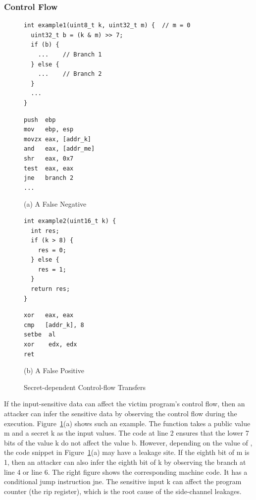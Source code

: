\subsubsection{Control Flow}
\begin{figure}[h]
\begin{minipage}{0.45\linewidth}
\begin{lstlisting}[xleftmargin=.0\textwidth, xrightmargin=.0\textwidth, frame=none]
int example1(uint8_t k, uint32_t m) {  // m = 0
  uint32_t b = (k & m) >> 7;
  if (b) {
    ...    // Branch 1
  } else {
    ...    // Branch 2
  }
  ...
}
\end{lstlisting}
\end{minipage}
\hfill
\begin{minipage}{0.45\linewidth}
\begin{lstlisting}[xleftmargin=.0\textwidth, xrightmargin=.00\textwidth, frame=none, numbers=none, mathescape=true]
push  ebp
mov   ebp, esp
movzx eax, [addr_k]    
and   eax, [addr_me] 
shr   eax, 0x7           
test  eax, eax
jne   branch 2
...
\end{lstlisting}
\end{minipage}\caption*{(a) A False Negative}

\begin{minipage}{0.45\linewidth}
\begin{lstlisting}[xleftmargin=.0\textwidth, xrightmargin=.0\textwidth, frame=none]
int example2(uint16_t k) {
  int res;
  if (k > 8) {
    res = 0;
  } else {
    res = 1;
  }
  return res;
}
\end{lstlisting}
\end{minipage}
\hfill
\begin{minipage}{0.45\linewidth}
\begin{lstlisting}[xleftmargin=.0\textwidth, xrightmargin=.00\textwidth, frame=none, numbers=none, mathescape=true]
xor   eax, eax
cmp   [addr_k], 8
setbe  al
xor    edx, edx
ret
\end{lstlisting}
\end{minipage}\caption*{(b) A False Positive}
\caption{Secret-dependent Control-flow Transfers}\label{fig:chapter3:cf}
\end{figure}

If the input-sensitive data can affect the victim program's control flow, then an attacker can infer the sensitive data by observing the control flow during the execution. Figure~\ref{fig:chapter3:cf}(a) shows such an example. The function takes a public value \textsf{m} and a secret \textsf{k} as the input values. The code at line 2 ensures that the lower 7 bits of the value \textsf{k} do not affect the value \textsf{b}. However, depending on the value of , the code snippet in Figure~\ref{fig:chapter3:cf}(a) may have a leakage site. If the eighth bit of \textsf{m} is 1, then an attacker can also infer the eighth bit of \textsf{k} by observing the branch at line 4 or line 6. The right figure shows the corresponding machine code. It has a conditional jump instruction \textsf{jne}. The sensitive input \textsf{k} can affect the program counter (the rip register), which is the root cause of the side-channel leakages. 

